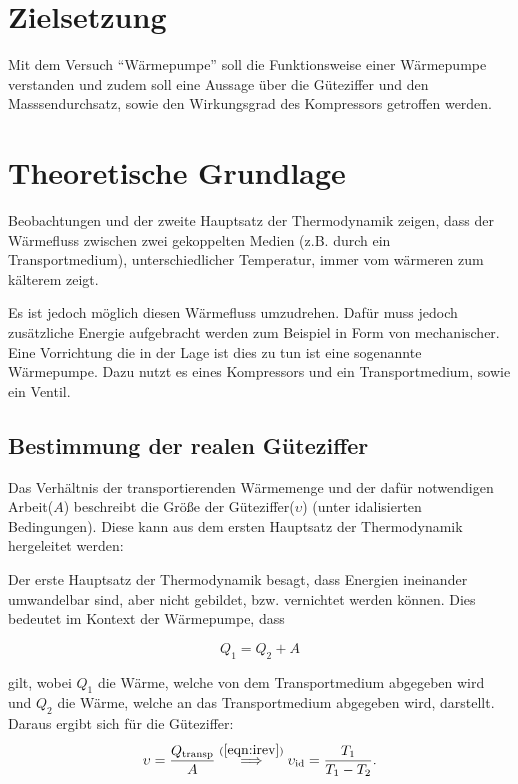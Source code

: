 
\usepackage[ version=4, math-greek=default, text-greek=default,
]{mhchem}


    \tableofcontents
    
    \newpage
    \section{Zielsetzung}
    Mit dem Versuch "`Wärmepumpe"' soll die Funktionsweise einer Wärmepumpe verstanden und zudem soll eine Aussage über die Güteziffer und den Masssendurchsatz,
    sowie den Wirkungsgrad des Kompressors getroffen werden.

    \section{Theoretische Grundlage}
    Beobachtungen und der zweite Hauptsatz der Thermodynamik zeigen, dass der Wärmefluss zwischen zwei gekoppelten Medien (z.B. durch ein Transportmedium), unterschiedlicher Temperatur, immer vom wärmeren zum kälterem zeigt.

    Es ist jedoch möglich diesen Wärmefluss umzudrehen. Dafür muss jedoch zusätzliche Energie aufgebracht werden zum Beispiel in Form von mechanischer. Eine Vorrichtung die in der Lage ist dies zu tun ist 
    eine sogenannte Wärmepumpe. Dazu nutzt es eines Kompressors und ein Transportmedium, sowie ein Ventil. 

        \subsection{Bestimmung der realen Güteziffer}
    	Das Verhältnis der transportierenden Wärmemenge und der dafür notwendigen Arbeit($A$) beschreibt die Größe der Güteziffer($\upsilon$) (unter idalisierten Bedingungen).
        Diese kann aus dem ersten Hauptsatz der Thermodynamik hergeleitet werden:

        Der erste Hauptsatz der Thermodynamik besagt, dass Energien ineinander umwandelbar sind, aber nicht gebildet, bzw. vernichtet werden können. 
        Dies bedeutet im Kontext der Wärmepumpe, dass

        \begin{equation}
            Q_1 = Q_2 + A
            \label{eqn:Th1}
        \end{equation}

        gilt, wobei $Q_1$ die Wärme, welche von dem Transportmedium abgegeben wird und $Q_2$ die Wärme, welche an das Transportmedium abgegeben wird, darstellt. Daraus ergibt sich für die Güteziffer:
        \begin{equation}
            \upsilon = \frac{Q_\text{transp}}{A} \stackrel{(\ref{eqn:irev})}{\implies} \upsilon_\text{id} = \frac{T_1}{T_1 - T_2}.
            \label{eqn:Gueteziffer}
        \end{equation}

